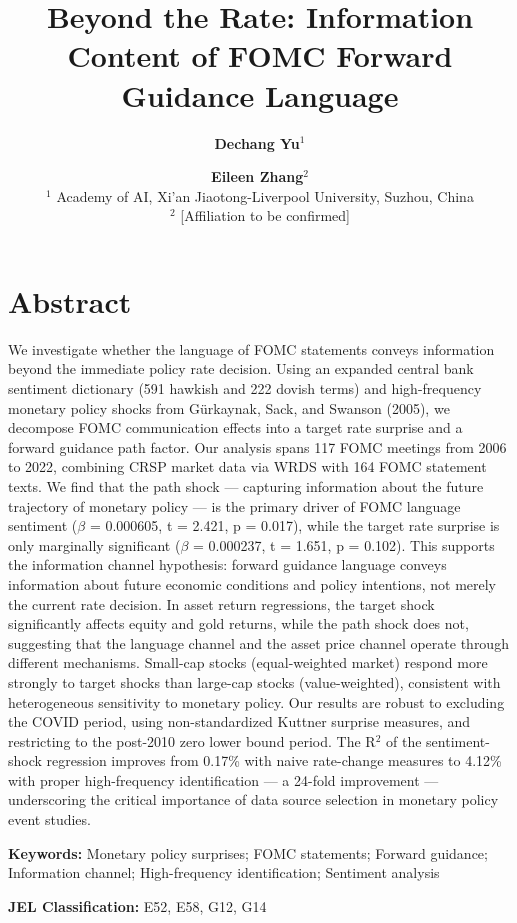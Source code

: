 \documentclass[12pt]{article}
\title{\textbf{Beyond the Rate: Information Content of FOMC Forward Guidance Language}}
\author{
\textbf{Dechang Yu}$^{1}$ \and \textbf{Eileen Zhang}$^{2}$ \\[6pt]
\small $^{1}$ Academy of AI, Xi'an Jiaotong-Liverpool University, Suzhou, China \\
\small $^{2}$ [Affiliation to be confirmed]
}
\date{}
\begin{document}
\maketitle


\section{Abstract}

We investigate whether the language of FOMC statements conveys information beyond the immediate policy rate decision. Using an expanded central bank sentiment dictionary (591 hawkish and 222 dovish terms) and high-frequency monetary policy shocks from G\"urkaynak, Sack, and Swanson (2005), we decompose FOMC communication effects into a target rate surprise and a forward guidance path factor. Our analysis spans 117 FOMC meetings from 2006 to 2022, combining CRSP market data via WRDS with 164 FOMC statement texts. We find that the path shock --- capturing information about the future trajectory of monetary policy --- is the primary driver of FOMC language sentiment ($\beta$ = 0.000605, t = 2.421, p = 0.017), while the target rate surprise is only marginally significant ($\beta$ = 0.000237, t = 1.651, p = 0.102). This supports the information channel hypothesis: forward guidance language conveys information about future economic conditions and policy intentions, not merely the current rate decision. In asset return regressions, the target shock significantly affects equity and gold returns, while the path shock does not, suggesting that the language channel and the asset price channel operate through different mechanisms. Small-cap stocks (equal-weighted market) respond more strongly to target shocks than large-cap stocks (value-weighted), consistent with heterogeneous sensitivity to monetary policy. Our results are robust to excluding the COVID period, using non-standardized Kuttner surprise measures, and restricting to the post-2010 zero lower bound period. The R$^2$ of the sentiment-shock regression improves from 0.17\% with naive rate-change measures to 4.12\% with proper high-frequency identification --- a 24-fold improvement --- underscoring the critical importance of data source selection in monetary policy event studies.

\textbf{Keywords:} Monetary policy surprises; FOMC statements; Forward guidance; Information channel; High-frequency identification; Sentiment analysis

\textbf{JEL Classification:} E52, E58, G12, G14
\end{document}
